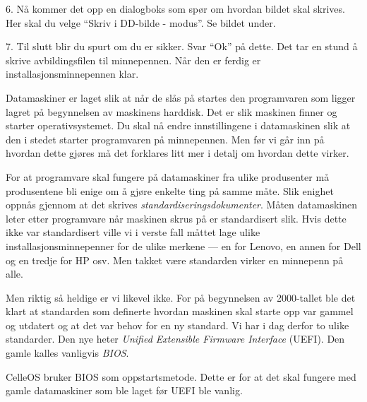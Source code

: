 \item{6.} N\aa{} kommer det opp en dialogboks som sp\o r om hvordan bildet skal skrives. Her skal du velge ``Skriv i DD-bilde - modus''. Se bildet under.
\vskip 1.5pc
\vskip 1.5pc
\item{7.} Til slutt blir du spurt om du er sikker. Svar ``Ok'' p\aa{} dette. Det tar en stund \aa{} skrive avbildingsfilen til minnepennen. N\aa r den er ferdig er installasjons\-minnepennen klar.


Datamaskiner er laget slik at n\aa r de sl\aa s p\aa{} startes den programvaren som ligger lagret p\aa{} begynnelsen av maskinens harddisk. Det er slik maskinen finner og starter operativsystemet. Du skal n\aa{} endre innstillingene i datamaskinen slik at den i stedet starter programvaren p\aa{} minnepennen. Men f\o r vi g\aa r inn p\aa{} hvordan dette gj\o res m\aa{} det forklares litt mer i detalj om hvordan dette virker.

For at programvare skal fungere p\aa{} datamaskiner fra ulike produsenter m\aa{} produsentene bli enige om  \aa{} gj\o re enkelte ting p\aa{} samme m\aa te. Slik enighet oppn\aa s gjennom at det skrives {\it standardiseringsdokumenter}. M\aa ten datamaskinen leter etter programvare n\aa r maskinen skrus p\aa{} er standardisert slik. Hvis dette ikke var standardisert ville vi i verste fall m\aa ttet lage ulike installasjonsminnepenner for de ulike merkene --- en for Lenovo, en annen for Dell og  en tredje for HP osv. Men takket v\ae re standarden virker en minnepenn p\aa{} alle.

Men riktig s\aa{} heldige er vi likevel ikke. For p\aa{} begynnelsen av 2000-tallet ble det klart at standarden som definerte hvordan maskinen skal starte opp var gammel og utdatert og at det var behov for en ny standard. Vi har i dag derfor to ulike standarder. Den nye heter {\it Unified Extensible Firmware Interface} (UEFI). Den gamle kalles vanligvis {\it BIOS}. 

CelleOS bruker BIOS som oppstartsmetode. Dette er for at det skal fungere med gamle datamaskiner som ble laget f\o r UEFI ble vanlig. 


